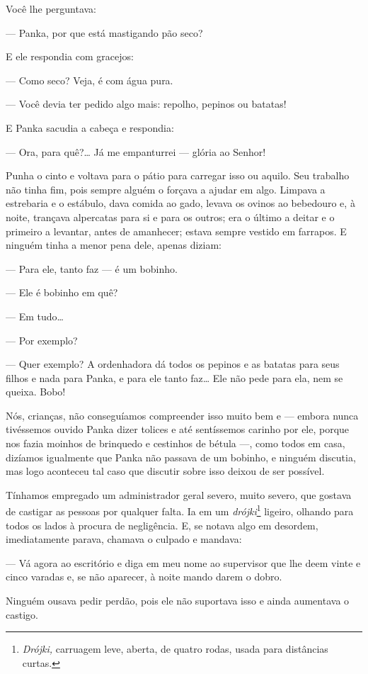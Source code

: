 Você lhe perguntava:

--- Panka, por que está mastigando pão seco?

E ele respondia com gracejos:

--- Como seco? Veja, é com água pura.

--- Você devia ter pedido algo mais: repolho, pepinos ou batatas!

E Panka sacudia a cabeça e respondia:

--- Ora, para quê?\ldots{} Já me empanturrei --- glória ao Senhor!

Punha o cinto e voltava para o pátio para carregar isso ou aquilo. Seu
trabalho não tinha fim, pois sempre alguém o forçava a ajudar em algo.
Limpava a estrebaria e o estábulo, dava comida ao gado, levava os ovinos
ao bebedouro e, à noite, trançava alpercatas para si e para os outros;
era o último a deitar e o primeiro a levantar, antes de amanhecer;
estava sempre vestido em farrapos. E ninguém tinha a menor pena dele, apenas
diziam:

--- Para ele, tanto faz --- é um bobinho.

--- Ele é bobinho em quê?

--- Em tudo\ldots{}

--- Por exemplo?

--- Quer exemplo? A ordenhadora dá todos os pepinos e as batatas para
seus filhos e nada para Panka, e para ele tanto faz\ldots{} Ele não pede para
ela, nem se queixa. Bobo!

Nós, crianças, não conseguíamos compreender isso muito bem e --- embora
nunca tivéssemos ouvido Panka dizer tolices e até sentíssemos carinho
por ele, porque nos fazia moinhos de brinquedo e cestinhos de bétula ---, como todos em casa, dizíamos igualmente que Panka não passava de
um bobinho, e ninguém discutia, mas logo aconteceu tal caso que discutir
sobre isso deixou de ser possível.

Tínhamos empregado um administrador geral severo, muito severo, que
gostava de castigar as pessoas por qualquer falta. Ia em um
\emph{drójki}\footnote{\emph{Drójki,} carruagem leve, aberta, de
  quatro rodas, usada para distâncias curtas.} ligeiro, olhando para
todos os lados à procura de negligência. E, se notava algo em desordem,
imediatamente parava, chamava o culpado e mandava:

--- Vá agora ao escritório e diga em meu nome ao supervisor que lhe deem
vinte e cinco varadas e, se não aparecer, à noite mando darem o dobro.

Ninguém ousava pedir perdão, pois ele não suportava isso e ainda
aumentava o castigo.

